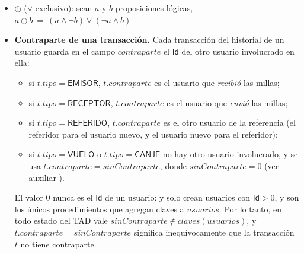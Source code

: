\documentclass[11pt,a4paper]{article}
\newcommand{\Tipo}[1]{\mathsf{#1}}
\begin{document}
    \begin{itemize}
        
        \item $\oplus$ ($\lor$ exclusivo): sean $a$ y $b$ proposiciones lógicas, $a \oplus b ~ = ~ (a \land \neg b) \lor (\neg a \land b)$

        
        

        \item \textbf{Contraparte de una transacción.} Cada transacción del historial de un usuario guarda en el
          campo $contraparte$ el $\Tipo{Id}$ del otro usuario involucrado en ella:
        \begin{itemize}
              \item si $t.tipo = \Tipo{EMISOR}$, $t.contraparte$ es el usuario que \emph{recibió} las millas;
              \item si $t.tipo = \Tipo{RECEPTOR}$, $t.contraparte$ es el usuario que \emph{envió} las millas;
              \item si $t.tipo = \Tipo{REFERIDO}$, $t.contraparte$ es el otro usuario de la referencia
                    (el referidor para el usuario nuevo, y el usuario nuevo para el referidor);
              \item si $t.tipo = \Tipo{VUELO}$ o $t.tipo = \Tipo{CANJE}$ no hay otro usuario involucrado, y se usa
                    $t.contraparte = sinContraparte$, donde $sinContraparte = 0$ (ver auxiliar
                    ).
          \end{itemize}
          El valor $0$ nunca es el $\Tipo{Id}$ de un usuario:  y
           solo crean usuarios con $\Tipo{Id} > 0$, y son los únicos
          procedimientos que agregan claves a $usuarios$. Por lo tanto, en todo estado del TAD vale
            $sinContraparte \notin claves(usuarios)$, y $t.contraparte = sinContraparte$ significa
          inequívocamente que la transacción $t$ no tiene contraparte.
    \end{itemize}
\end{document}
